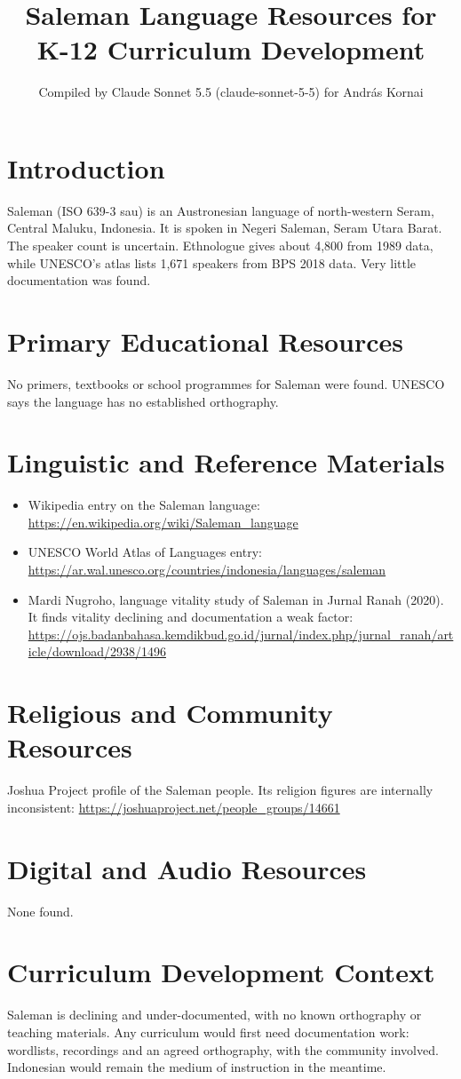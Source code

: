 \documentclass[12pt]{article}
\title{Saleman Language Resources for K-12 Curriculum Development}
\author{Compiled by Claude Sonnet 5.5 (claude-sonnet-5-5) for Andr\'as Kornai}
\date{}
\begin{document}
\maketitle

\section{Introduction}
Saleman (ISO 639-3 sau) is an Austronesian language of north-western Seram, Central Maluku, Indonesia. It is spoken in Negeri Saleman, Seram Utara Barat. The speaker count is uncertain. Ethnologue gives about 4,800 from 1989 data, while UNESCO's atlas lists 1,671 speakers from BPS 2018 data. Very little documentation was found.

\section{Primary Educational Resources}
No primers, textbooks or school programmes for Saleman were found. UNESCO says the language has no established orthography.

\section{Linguistic and Reference Materials}
\begin{itemize}
\item Wikipedia entry on the Saleman language: \url{https://en.wikipedia.org/wiki/Saleman_language}
\item UNESCO World Atlas of Languages entry: \url{https://ar.wal.unesco.org/countries/indonesia/languages/saleman}
\item Mardi Nugroho, language vitality study of Saleman in Jurnal Ranah (2020). It finds vitality declining and documentation a weak factor: \url{https://ojs.badanbahasa.kemdikbud.go.id/jurnal/index.php/jurnal_ranah/article/download/2938/1496}
\end{itemize}

\section{Religious and Community Resources}
Joshua Project profile of the Saleman people. Its religion figures are internally inconsistent: \url{https://joshuaproject.net/people_groups/14661}

\section{Digital and Audio Resources}
None found.

\section{Curriculum Development Context}
Saleman is declining and under-documented, with no known orthography or teaching materials. Any curriculum would first need documentation work: wordlists, recordings and an agreed orthography, with the community involved. Indonesian would remain the medium of instruction in the meantime.
\end{document}
